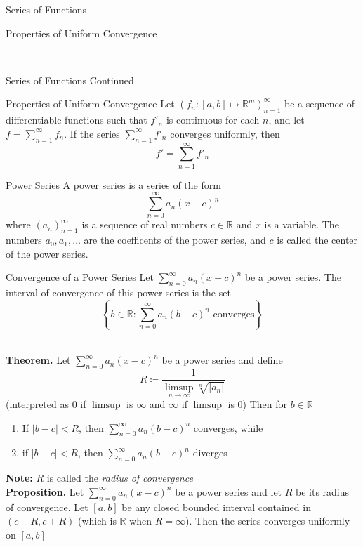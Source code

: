 \documentclass{article}
\newcommand{\real}{\mathbb{R}}
\begin{document}
\begin{multicols*}{3}
\begin{blackbox}{Series of Functions}
\begin{bluebox}{Properties of Uniform Convergence}
    \end{bluebox} \\[-2ex]
\end{blackbox}
\begin{blackbox}{Series of Functions Continued}
\begin{bluebox}{Properties of Uniform Convergence}
    Let  $(f_n: [a,b] \mapsto \real^m)_{n=1}^\infty$ be a sequence of differentiable functions such that $f'_n$ is continuous for each $n$, and let $f = \sum\limits_{n=1}^\infty f_n$. If the series $\sum\limits_{n=1}^\infty f'_n$ converges uniformly, then 
    \[f' = \sum\limits_{n=1}^\infty f'_n\]
\end{bluebox}
\end{blackbox}
\begin{blackbox}{Power Series}
    A power series is a series of the form 
    \[\sum_{n=0}^\infty a_n(x-c)^n\]
    where $(a_n)_{n=1}^\infty$ is a sequence of real numbers $c \in \real$ and $x$ is a variable. The numbers $a_0, a_1, \ldots$ are the coefficents of the power series, and $c$ is called the center of the power series. \\[2ex]
    \begin{pinkbox}{Convergence of a Power Series}
        Let $\sum\limits_{n=0}^\infty a_n(x-c)^n$ be a power series. The interval of convergence of this power series is the set 
        \[\left\{b \in \real: \sum_{n=0}^\infty a_n(b-c)^n \text{ converges}\right\}\]
    \end{pinkbox}\\[1ex]
    \textbf{Theorem.} Let $\sum\limits_{n=0}^\infty a_n(x-c)^n$ be a power series and define 
    \[R \coloneqq \frac{1}{\limsup\limits_{n\rightarrow\infty} \sqrt[n]{|a_n|}}\]
    (interpreted as 0 if $\limsup$ is $\infty$ and $\infty$ if $\limsup$ is 0) Then for $b \in \real$
    \begin{enumerate}[label=(\roman*)]
        \item If $|b - c| < R$, then $\sum\limits_{n=0}^\infty a_n(b-c)^n$ converges, while
        \item if $|b - c| < R$, then  $\sum\limits_{n=0}^\infty a_n(b-c)^n$ diverges
    \end{enumerate}
    \textbf{Note:} $R$ is called the \emph{radius of convergence}\\[2ex]
    \textbf{Proposition.} Let  $\sum\limits_{n=0}^\infty a_n(x-c)^n$ be a power series and let $R$ be its radius of convergence. Let $[a,b]$ be any closed bounded interval contained in $(c-R, c+R)$ (which is $\real$ when $R = \infty$). Then the series converges uniformly on $[a,b]$

\end{blackbox}
\end{multicols*}
\end{document}

